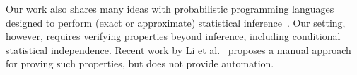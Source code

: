 Our work also shares many ideas with probabilistic programming
languages designed to perform (exact or approximate) statistical
inference~\cite{holtzen2020scaling,carpenter2017stan,wood2014new,bingham2019pyro,albarghouthi2017fairsquare,de2007problog,pfeffer2009figaro,saad2021sppl}. Our setting, however, requires
verifying properties beyond inference, including conditional
statistical independence. Recent work by Li et al.~\cite{li2023lilac} proposes a
manual approach for proving such properties, but does not provide
automation.


